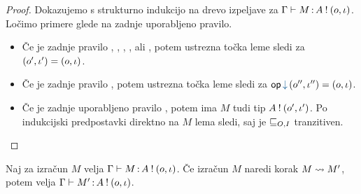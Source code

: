 \begin{proof}
	Dokazujemo s strukturno indukcijo na drevo izpeljave za $\Gamma \vdash M \mathinner{:} A \mathbin{!} (o, \iota)$.
	Ločimo primere glede na zadnje uporabljeno pravilo.
	
	\begin{itemize}
		\item Če je zadnje pravilo , , , ,  ali , potem ustrezna točka leme sledi za $(o', \iota') = (o, \iota)$.
		
		\item Če je zadnje pravilo , potem ustrezna točka leme sledi za $\opincomp{op}{(\o'', \i'')} = (\o, \i)$.
		
		\item Če je zadnje uporabljeno pravilo , potem ima $M$ tudi tip $A \mathbin{!} (o', \iota')$. Po indukcijski predpostavki direktno na $M$ lema sledi, saj je $\sqsubseteq_{O, I}$ tranzitiven.
	\end{itemize}
\end{proof}

\begin{trditev}[o ohranitvi]\label{trd:ohranitev-izracuni}
	Naj za izračun $M$ velja $\Gamma \vdash M \mathinner{:} A \mathbin{!} (o, \iota)$. Če izračun $M$ naredi korak $M \leadsto M'$, potem velja $\Gamma \vdash M' \mathinner{:} A \mathbin{!} (o, \iota)$.
\end{trditev}

